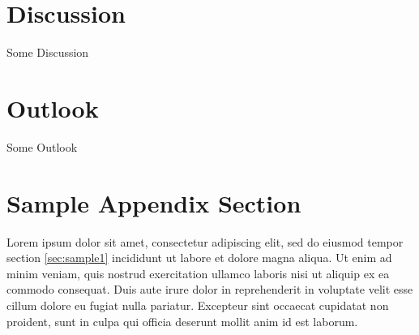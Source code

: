 \documentclass[5p,times]{elsarticle}
\begin{document}
\section{Discussion}
\label{sec:discussion}
Some Discussion

\section{Outlook}
\label{sec:outlook}
Some Outlook
\appendix

\section{Sample Appendix Section}
\label{sec:sample:appendix}
Lorem ipsum dolor sit amet, consectetur adipiscing elit, sed do eiusmod tempor section \ref{sec:sample1} incididunt ut labore et dolore magna aliqua. Ut enim ad minim veniam, quis nostrud exercitation ullamco laboris nisi ut aliquip ex ea commodo consequat. Duis aute irure dolor in reprehenderit in voluptate velit esse cillum dolore eu fugiat nulla pariatur. Excepteur sint occaecat cupidatat non proident, sunt in culpa qui officia deserunt mollit anim id est laborum.

 






\end{document}
